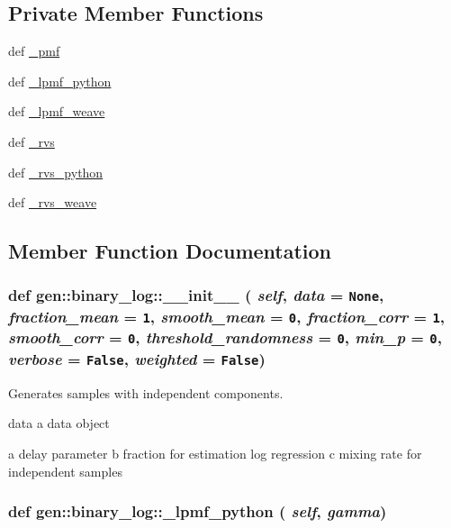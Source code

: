 \subsection*{Private Member Functions}
\begin{CompactItemize}
\item 
def \hyperlink{classgen_1_1binary__log_9cc5e523c3d8456841c5c6354c0836c9}{\_\-pmf}
\item 
def \hyperlink{classgen_1_1binary__log_0167164fcf8820ff3be74419fac5a94c}{\_\-lpmf\_\-python}
\item 
def \hyperlink{classgen_1_1binary__log_35aba5cb13973e4a87d5e1eb14cdb8c4}{\_\-lpmf\_\-weave}
\item 
def \hyperlink{classgen_1_1binary__log_49360ebc4d0614736e8592b67b57f3d9}{\_\-rvs}
\item 
def \hyperlink{classgen_1_1binary__log_4278341c96c57b9029279a171df333ba}{\_\-rvs\_\-python}
\item 
def \hyperlink{classgen_1_1binary__log_8aac82d539642a049e2c4c8a11753f3f}{\_\-rvs\_\-weave}
\end{CompactItemize}


\subsection{Member Function Documentation}
\hypertarget{classgen_1_1binary__log_46e453f2e09cc74cba4d43a8622db45f}{
\subsubsection[{\_\-\_\-init\_\-\_\-}]{\setlength{\rightskip}{0pt plus 5cm}def gen::binary\_\-log::\_\-\_\-init\_\-\_\- ( {\em self}, \/   {\em data} = {\tt None}, \/   {\em fraction\_\-mean} = {\tt 1}, \/   {\em smooth\_\-mean} = {\tt 0}, \/   {\em fraction\_\-corr} = {\tt 1}, \/   {\em smooth\_\-corr} = {\tt 0}, \/   {\em threshold\_\-randomness} = {\tt 0}, \/   {\em min\_\-p} = {\tt 0}, \/   {\em verbose} = {\tt False}, \/   {\em weighted} = {\tt False})}}
\label{classgen_1_1binary__log_46e453f2e09cc74cba4d43a8622db45f}


Generates samples with independent components. 

data a data object

a delay parameter b fraction for estimation log regression c mixing rate for independent samples \hypertarget{classgen_1_1binary__log_0167164fcf8820ff3be74419fac5a94c}{
\subsubsection[{\_\-lpmf\_\-python}]{\setlength{\rightskip}{0pt plus 5cm}def gen::binary\_\-log::\_\-lpmf\_\-python ( {\em self}, \/   {\em gamma})}}
\label{classgen_1_1binary__log_0167164fcf8820ff3be74419fac5a94c}


